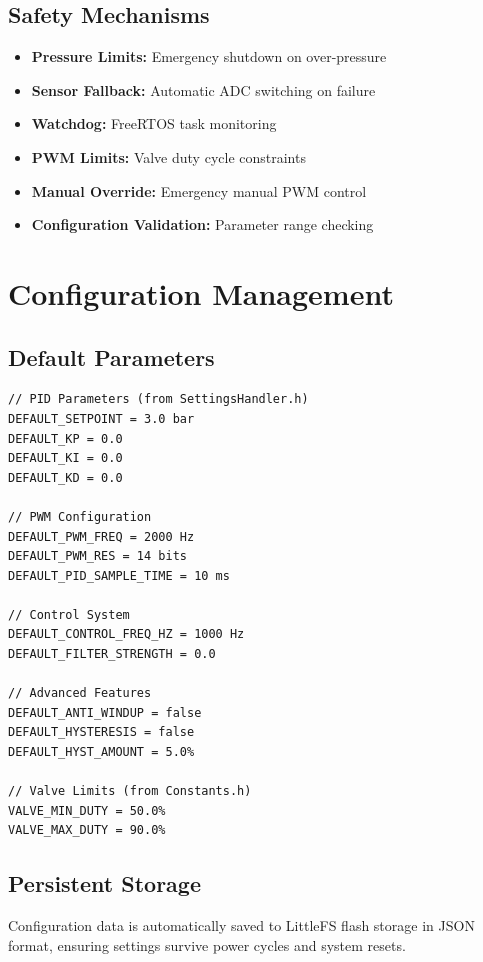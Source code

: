 \documentclass[12pt,a4paper]{article}
\begin{document}
\subsection{Safety Mechanisms}
\begin{itemize}
    \item \textbf{Pressure Limits:} Emergency shutdown on over-pressure
    \item \textbf{Sensor Fallback:} Automatic ADC switching on failure
    \item \textbf{Watchdog:} FreeRTOS task monitoring
    \item \textbf{PWM Limits:} Valve duty cycle constraints
    \item \textbf{Manual Override:} Emergency manual PWM control
    \item \textbf{Configuration Validation:} Parameter range checking
\end{itemize}

\section{Configuration Management}

\subsection{Default Parameters}
\begin{lstlisting}[caption=System Default Configuration]
// PID Parameters (from SettingsHandler.h)
DEFAULT_SETPOINT = 3.0 bar
DEFAULT_KP = 0.0
DEFAULT_KI = 0.0  
DEFAULT_KD = 0.0

// PWM Configuration
DEFAULT_PWM_FREQ = 2000 Hz
DEFAULT_PWM_RES = 14 bits
DEFAULT_PID_SAMPLE_TIME = 10 ms

// Control System
DEFAULT_CONTROL_FREQ_HZ = 1000 Hz
DEFAULT_FILTER_STRENGTH = 0.0

// Advanced Features
DEFAULT_ANTI_WINDUP = false
DEFAULT_HYSTERESIS = false
DEFAULT_HYST_AMOUNT = 5.0%

// Valve Limits (from Constants.h)
VALVE_MIN_DUTY = 50.0%
VALVE_MAX_DUTY = 90.0%
\end{lstlisting}

\subsection{Persistent Storage}
Configuration data is automatically saved to LittleFS flash storage in JSON format, ensuring settings survive power cycles and system resets.
\end{document}
